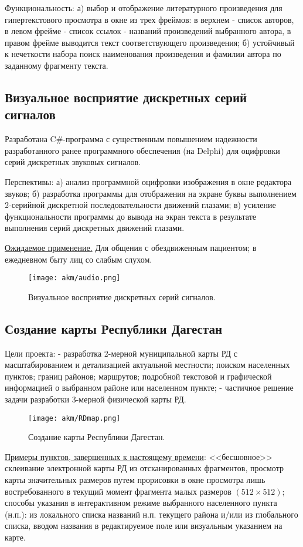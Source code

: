 Функциональность: а) выбор и отображение литературного произведения для гипертекстового просмотра в окне из трех фреймов: в верхнем - список авторов, в левом фрейме - список ссылок - названий произведений выбранного автора, в правом фрейме выводится текст соответствующего произведения;
б) устойчивый к нечеткости набора поиск наименования произведения и фамилии автора по заданному фрагменту текста.


\subsection{Визуальное восприятие дискретных серий сигналов}

Разработана C\#-программа с существенным повышением надежности разработанного ранее программного обеспечения (на Delphi) для оцифровки серий дискретных звуковых сигналов.

Перспективы: а) анализ программной оцифровки изображения в окне редактора звуков; 
б) разработка программы для отображения на экране буквы выполнением 2-серийной дискретной последовательности движений глазами; в) усиление функциональности программы до вывода на экран текста в результате выполнения серий дискретных движений глазами. 

\underline{Ожидаемое применение.}
Для общения с обездвиженным пациентом;  в ежедневном быту лиц со слабым слухом.
\begin{figure}[h]
    \begin{center}
        \texttt{[image: akm/audio.png]}
    \end{center}
    \caption*{Визуальное восприятие дискретных серий сигналов.}
\end{figure}


\subsection{Создание карты Республики Дагестан}

Цели проекта: - разработка 2-мерной муниципальной карты РД с масштабированием и детализацией актуальной местности; поиском населенных пунктов; границ районов; маршрутов; подробной текстовой и графической информацией о выбранном районе или населенном пункте; - частичное решение задачи разработки 3-мерной физической карты РД.
\begin{figure}[h]
    \begin{center}
        \texttt{[image: akm/RDmap.png]}
    \end{center}
    \caption*{Создание карты Республики Дагестан.}
\end{figure}
\underline{Примеры пунктов, завершенных к настоящему времени}: <<бесшовное>> склеивание электронной карты РД из отсканированных фрагментов,
просмотр карты значительных размеров путем прорисовки в окне просмотра лишь востребованного в текущий момент фрагмента малых размеров $(512\times 512)$; способы указания в интерактивном режиме выбранного населенного пункта (н.п.): из локального списка названий н.п. текущего района и/или из глобального списка, вводом названия в редактируемое поле или визуальным указанием на карте. 


